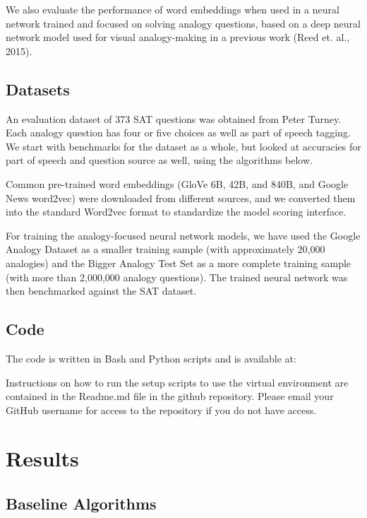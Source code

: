 \documentclass[11pt]{article}
\begin{document}
We also evaluate the performance of word embeddings when used in a
neural network trained and focused on solving analogy questions, based
on a deep neural network model used for visual analogy-making in a
previous work (Reed et. al., 2015).

\subsection{Datasets}

An evaluation dataset of 373 SAT questions was obtained from Peter
Turney. Each analogy question has four or five choices as well as part
of speech tagging. We start with benchmarks for the dataset as a whole,
but looked at accuracies for part of speech and question source as well,
using the algorithms below.

Common pre-trained word embeddings (GloVe 6B, 42B, and 840B, and Google
News word2vec) were downloaded from different sources, and we converted
them into the standard Word2vec format to standardize the model scoring
interface.

For training the analogy-focused neural network models, we have used the
Google Analogy Dataset as a smaller training sample (with approximately
20,000 analogies) and the Bigger Analogy Test Set as a more complete
training sample (with more than 2,000,000 analogy questions). The
trained neural network was then benchmarked against the SAT dataset.

\subsection{Code}

The code is written in Bash and Python scripts and is available at:

Instructions on how to run the setup scripts to use the virtual
environment are contained in the Readme.md file in the github
repository. Please email
your GitHub username for access to the repository if you do not have
access.

\section{Results }

\subsection{Baseline Algorithms}
\end{document}
